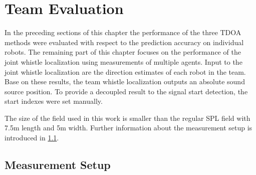\newpage
{}
\section{Team Evaluation}
\label{sec:04_teamEvaluation}


In the preceding sections of this chapter the performance of the three
\ac{TDOA} methods were evaluated with respect to the prediction accuracy on
individual robots.
The remaining part of this chapter focuses on the performance of the joint
whistle localization using measurements of multiple agents. 
Input to the joint whistle localization are the direction estimates of each
robot in the team. Base on these results, the team whistle localization outputs
an absolute sound source position. To provide a decoupled result to the signal
start detection, the start indexes were set manually. 

The size of the field used in this work is smaller than the regular \ac{SPL}
field with 7.5\si{m} length and 5\si{m} width.
Further information about the measurement setup is introduced in
\cref{subsec:04_labMeasurements}.

\subsection{Measurement Setup}
\label{subsec:04_labMeasurements}

